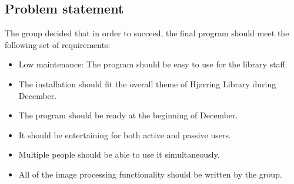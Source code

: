 \subsection{Problem statement}\label{problemStatement}
The group decided that in order to succeed, the final program should meet the following set of requirements:

\begin{itemize}
\item Low maintenance: The program should be easy to use for the library staff.
\item The installation should fit the overall theme of Hj{\o}rring Library during December.
\item The program should be ready at the beginning of December.
\item It should be entertaining for both active and passive users.
\item Multiple people should be able to use it simultaneously.
\item All of the image processing functionality should be written by the group.
\end{itemize}